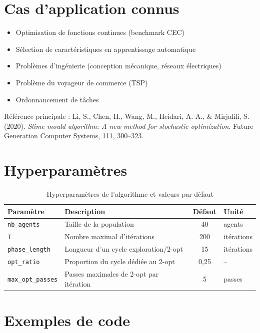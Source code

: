 \documentclass[12pt,a4paper]{report}
\begin{document}
\chapter{Cas d'application connus}

\begin{itemize}
	\item Optimisation de fonctions continues (benchmark CEC)
	\item Sélection de caractéristiques en apprentissage automatique
	\item Problèmes d'ingénierie (conception mécanique, réseaux électriques)
	\item Problème du voyageur de commerce (TSP)
	\item Ordonnancement de tâches
\end{itemize}

Référence principale : Li, S., Chen, H., Wang, M., Heidari, A. A., \& Mirjalili, S. (2020).
\textit{Slime mould algorithm: A new method for stochastic optimization}.
Future Generation Computer Systems, 111, 300--323.

\chapter{Hyperparamètres}

\begin{table}[h]
	\centering
	\begin{tabular}{@{}llcl@{}}
		\toprule
		\textbf{Paramètre} & \textbf{Description} & \textbf{Défaut} & \textbf{Unité} \\
		\midrule
		\texttt{nb\_agents}      & Taille de la population                & 40  & agents \\
		\texttt{T}               & Nombre maximal d'itérations            & 200 & itérations \\
		\texttt{phase\_length}   & Longueur d'un cycle exploration/2-opt  & 15  & itérations \\
		\texttt{opt\_ratio}      & Proportion du cycle dédiée au 2-opt    & 0,25 & -- \\
		\texttt{max\_opt\_passes}& Passes maximales de 2-opt par itération & 5   & passes \\
		\bottomrule
	\end{tabular}
	\caption{Hyperparamètres de l'algorithme et valeurs par défaut}
\end{table}

\chapter{Exemples de code}
\end{document}
